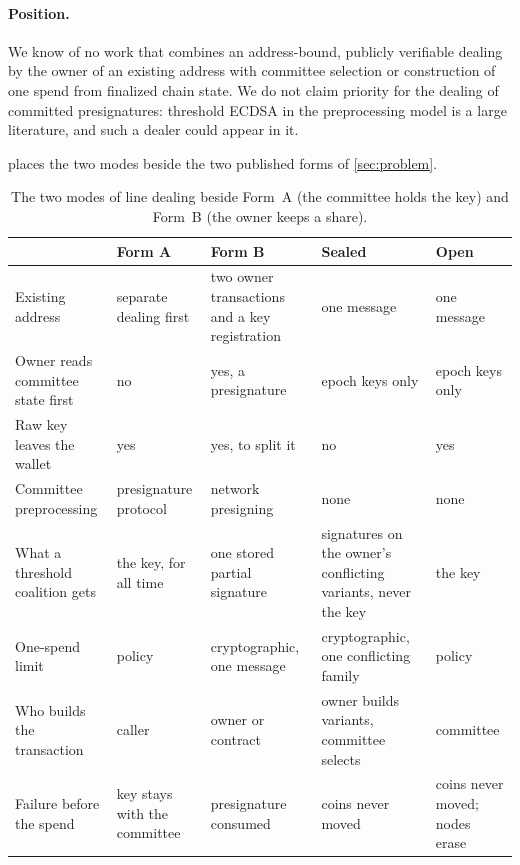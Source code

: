 \paragraph{Position.} We know of no work that combines an address-bound, publicly verifiable dealing by the owner of an existing address with committee selection or construction of one spend from finalized chain state. We do not claim priority for the dealing of committed presignatures: threshold ECDSA in the preprocessing model is a large literature, and such a dealer could appear in it.

 places the two modes beside the two published forms of \cref{sec:problem}.

\begin{table}[t]
\centering
\small
\begin{tabularx}{\linewidth}{@{}>{\raggedright\arraybackslash}p{2.9cm}>{\raggedright\arraybackslash}X>{\raggedright\arraybackslash}X>{\raggedright\arraybackslash}X>{\raggedright\arraybackslash}X@{}}
\toprule
 & Form A & Form B & Sealed & Open \\
\midrule
Existing address & separate dealing first & two owner transactions and a key registration & one message & one message \\
Owner reads committee state first & no & yes, a presignature & epoch keys only & epoch keys only \\
Raw key leaves the wallet & yes & yes, to split it & no & yes \\
Committee preprocessing & presignature protocol & network presigning & none & none \\
What a threshold coalition gets & the key, for all time & one stored partial signature & signatures on the owner's conflicting variants, never the key & the key \\
One-spend limit & policy & cryptographic, one message & cryptographic, one conflicting family & policy \\
Who builds the transaction & caller & owner or contract & owner builds variants, committee selects & committee \\
Failure before the spend & key stays with the committee & presignature consumed & coins never moved & coins never moved; nodes erase \\
\bottomrule
\end{tabularx}
\caption{The two modes of line dealing beside Form~A (the committee holds the key) and Form~B (the owner keeps a share).}
\label{tab:forms}
\end{table}
